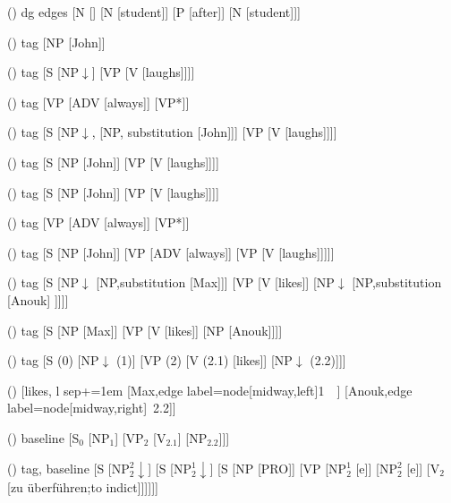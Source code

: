 \begin {forest}()
 dg edges [N [\trace ] [N [student]] [P [after]] [N [student]]] \end {forest}
\begin {forest}()
 tag [NP [John]] \end {forest}
\begin {forest}()
 tag [S [NP$\downarrow $] [VP [V [laughs]]]] \end {forest}
\begin {forest}()
 tag [VP [ADV [always]] [VP*]] \end {forest}
\begin {forest}()
 tag [S [NP$\downarrow $, [NP, substitution [John]]] [VP [V [laughs]]]] \end {forest}
\begin {forest}()
 tag [S [NP [John]] [VP [V [laughs]]]] \end {forest}
\begin {forest}()
 tag [S [NP [John]] [VP [V [laughs]]]] \end {forest}
\begin {forest}()
 tag [VP [ADV [always]] [VP*]] \end {forest}
\begin {forest}()
 tag [S [NP [John]] [VP [ADV [always]] [VP [V [laughs]]]]] \end {forest}
\begin {forest}()
 tag [S [NP$\downarrow $ [NP,substitution [Max]]] [VP [V [likes]] [NP$\downarrow $ [NP,substitution [Anouk] ]]]] \end {forest}
\begin {forest}()
 tag [S [NP [Max]] [VP [V [likes]] [NP [Anouk]]]] \end {forest}
\begin {forest}()
 tag [S {(0)} [NP$\downarrow $ {(1)}] [VP {(2)} [V {(2.1)} [likes]] [NP$\downarrow $ {(2.2)}]]] \end {forest}
\begin {forest}()
 [likes, l sep+=1em [Max,edge label={node[midway,left]{1~~}}] [Anouk,edge label={node[midway,right]{~2.2}}]] \end {forest}
\begin {forest}()
baseline [S$_0$ [NP$_1$] [VP$_2$ [V$_{2.1}$] [NP$_{2.2}$]]] \end {forest}
\begin {forest}()
 tag, baseline [S [NP$_2^2\downarrow $] [S [NP$_2^1\downarrow $] [S [NP [PRO]] [VP [NP$_2^1$ [e]] [NP$_2^2$ [e]] [V$_2$ [zu überführen;to indict]]]]]] \end {forest}
